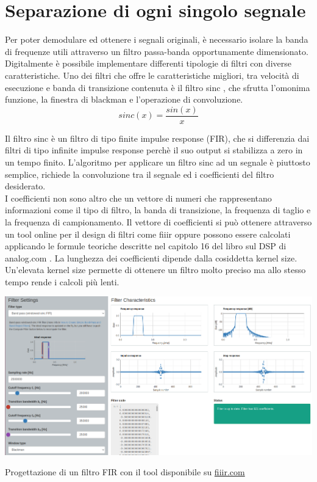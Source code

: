 \documentclass{article}
\begin{document}
\section{Separazione di ogni singolo segnale}
Per poter demodulare ed ottenere i segnali originali, è necessario isolare la banda di frequenze utili attraverso un filtro
passa-banda opportunamente dimensionato.\\
Digitalmente è possibile implementare differenti tipologie di filtri con diverse caratteristiche. Uno dei filtri che offre
le caratteristiche migliori, tra velocità di esecuzione e banda di transizione contenuta è il filtro sinc \cite{sinc},
che sfrutta l'omonima funzione, la finestra di blackman e l'operazione di convoluzione.\\

\begin{equation}
    sinc(x) = \frac{sin(x)}{x}
\end{equation}

Il filtro sinc è un filtro di tipo finite impulse response (FIR), che si differenzia dai filtri di tipo infinite impulse response
perchè il suo output si stabilizza a zero in un tempo finito. L'algoritmo per applicare un filtro sinc ad un segnale è
piuttosto semplice, richiede la convoluzione \cite{convolution} tra il segnale ed i coefficienti del filtro desiderato.\\
I coefficienti non sono altro che un vettore di numeri che rappresentano informazioni come il tipo di filtro, la banda di
transizione, la frequenza di taglio e la frequenza di campionamento. Il vettore di coefficienti si può ottenere attraverso un
tool online per il design di filtri come fiiir \cite{fiiir} oppure possono essere calcolati applicando le formule teoriche descritte
nel capitolo 16 del libro sul DSP di analog.com \cite{dsp-book-ch16}. La lunghezza dei coefficienti dipende dalla cosiddetta kernel
size. Un'elevata kernel size permette di ottenere un filtro molto preciso ma allo stesso tempo rende i calcoli più lenti.\\

\begin{center}
    \includegraphics[width=\textwidth]{fiiir.png}
\end{center}
Progettazione di un filtro FIR con il tool disponibile su \href{https://fiiir.com}{fiiir.com}\\
\end{document}
